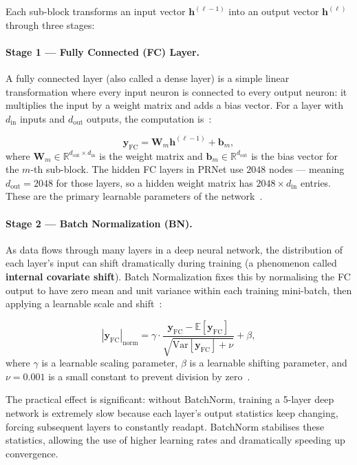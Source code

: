 Each sub-block transforms an input vector $\bm{h}^{(\ell-1)}$ into an output vector $\bm{h}^{(\ell)}$ through three stages:

\paragraph{Stage 1 --- Fully Connected (FC) Layer.}
A fully connected layer (also called a dense layer) is a simple linear transformation where every input neuron is connected to every output neuron: it multiplies the input by a weight matrix and adds a bias vector. For a layer with $d_{\mathrm{in}}$ inputs and $d_{\mathrm{out}}$ outputs, the computation is~\cite{kim2017novel}:

\begin{equation*}
    \bm{y}_{\mathrm{FC}} = \bm{W}_m \bm{h}^{(\ell-1)} + \bm{b}_m,
\end{equation*}
where $\bm{W}_m \in \mathbb{R}^{d_{\mathrm{out}} \times d_{\mathrm{in}}}$ is the weight matrix and $\bm{b}_m \in \mathbb{R}^{d_{\mathrm{out}}}$ is the bias vector for the $m$-th sub-block. The hidden FC layers in PRNet use $2048$ nodes --- meaning $d_{\mathrm{out}} = 2048$ for those layers, so a hidden weight matrix has $2048 \times d_{\mathrm{in}}$ entries. These are the primary learnable parameters of the network~\cite{kim2017novel}.

\paragraph{Stage 2 --- Batch Normalization (BN).}
As data flows through many layers in a deep neural network, the distribution of each layer's input can shift dramatically during training (a phenomenon called \textbf{internal covariate shift}). Batch Normalization fixes this by normalising the FC output to have zero mean and unit variance within each training mini-batch, then applying a learnable scale and shift~\cite{kim2017novel}:

\begin{equation*}
    |\bm{y}_{\mathrm{FC}}|_{\mathrm{norm}}
    = \gamma \cdot
    \frac{\bm{y}_{\mathrm{FC}} - \mathbb{E}[\bm{y}_{\mathrm{FC}}]}
    {\sqrt{\mathrm{Var}[\bm{y}_{\mathrm{FC}}] + \nu}}
    + \beta,
\end{equation*}
where $\gamma$ is a learnable scaling parameter, $\beta$ is a learnable shifting parameter, and $\nu = 0.001$ is a small constant to prevent division by zero~\cite{kim2017novel}.

The practical effect is significant: without BatchNorm, training a 5-layer deep network is extremely slow because each layer's output statistics keep changing, forcing subsequent layers to constantly readapt. BatchNorm stabilises these statistics, allowing the use of higher learning rates and dramatically speeding up convergence.

